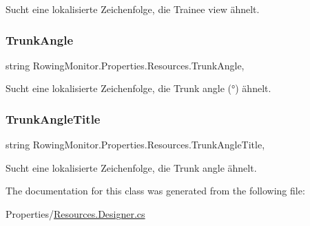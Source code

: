 Sucht eine lokalisierte Zeichenfolge, die Trainee view ähnelt. 

\mbox{\label{class_rowing_monitor_1_1_properties_1_1_resources_acc2d7716003cd33c03211424dc63b7c9}} 
\subsubsection{\texorpdfstring{Trunk\+Angle}{TrunkAngle}}
{\footnotesize\ttfamily string Rowing\+Monitor.\+Properties.\+Resources.\+Trunk\+Angle\hspace{0.3cm}{\ttfamily [static]}, {\ttfamily [get]}}



Sucht eine lokalisierte Zeichenfolge, die Trunk angle (°) ähnelt. 

\mbox{\label{class_rowing_monitor_1_1_properties_1_1_resources_a8e28b98be3db69f55589b3fd45ef4afd}} 
\subsubsection{\texorpdfstring{Trunk\+Angle\+Title}{TrunkAngleTitle}}
{\footnotesize\ttfamily string Rowing\+Monitor.\+Properties.\+Resources.\+Trunk\+Angle\+Title\hspace{0.3cm}{\ttfamily [static]}, {\ttfamily [get]}}



Sucht eine lokalisierte Zeichenfolge, die Trunk angle ähnelt. 



The documentation for this class was generated from the following file\+:\begin{DoxyCompactItemize}
\item 
Properties/\hyperlink{_resources_8_designer_8cs}{Resources.\+Designer.\+cs}\end{DoxyCompactItemize}
